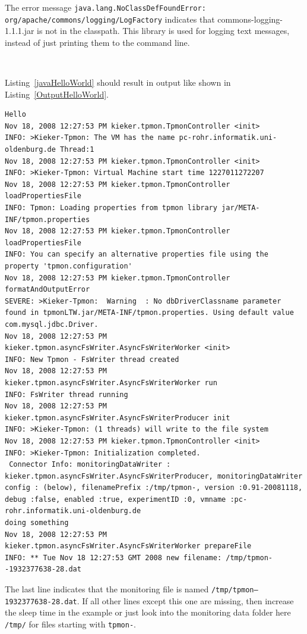 \documentclass[a4paper,12pt]{scrartcl}
\begin{document}
The error message \texttt{\small java.lang.NoClassDefFoundError:\\org/apache/commons/logging/LogFactory} indicates that commons-logging-1.1.1.jar is not in the classpath. This library is used for logging text messages, instead of just printing them to the command line.

\

Listing~\ref{javaHelloWorld} should result in output like shown in Listing~\ref{OutputHelloWorld}.
\begin{lstlisting}[caption={Compilation and execution with AspectJ's Java agent.},label={OutputHelloWorld},language=clean,basicstyle=\ttfamily\footnotesize,keywordstyle=\ttfamily\footnotesize]
Hello
Nov 18, 2008 12:27:53 PM kieker.tpmon.TpmonController <init>
INFO: >Kieker-Tpmon: The VM has the name pc-rohr.informatik.uni-oldenburg.de Thread:1
Nov 18, 2008 12:27:53 PM kieker.tpmon.TpmonController <init>
INFO: >Kieker-Tpmon: Virtual Machine start time 1227011272207
Nov 18, 2008 12:27:53 PM kieker.tpmon.TpmonController loadPropertiesFile
INFO: Tpmon: Loading properties from tpmon library jar/META-INF/tpmon.properties
Nov 18, 2008 12:27:53 PM kieker.tpmon.TpmonController loadPropertiesFile
INFO: You can specify an alternative properties file using the property 'tpmon.configuration'
Nov 18, 2008 12:27:53 PM kieker.tpmon.TpmonController formatAndOutputError
SEVERE: >Kieker-Tpmon:  Warning  : No dbDriverClassname parameter found in tpmonLTW.jar/META-INF/tpmon.properties. Using default value com.mysql.jdbc.Driver.
Nov 18, 2008 12:27:53 PM kieker.tpmon.asyncFsWriter.AsyncFsWriterWorker <init>
INFO: New Tpmon - FsWriter thread created
Nov 18, 2008 12:27:53 PM kieker.tpmon.asyncFsWriter.AsyncFsWriterWorker run
INFO: FsWriter thread running
Nov 18, 2008 12:27:53 PM kieker.tpmon.asyncFsWriter.AsyncFsWriterProducer init
INFO: >Kieker-Tpmon: (1 threads) will write to the file system
Nov 18, 2008 12:27:53 PM kieker.tpmon.TpmonController <init>
INFO: >Kieker-Tpmon: Initialization completed.
 Connector Info: monitoringDataWriter : kieker.tpmon.asyncFsWriter.AsyncFsWriterProducer, monitoringDataWriter config : (below), filenamePrefix :/tmp/tpmon-, version :0.91-20081118, debug :false, enabled :true, experimentID :0, vmname :pc-rohr.informatik.uni-oldenburg.de
doing something
Nov 18, 2008 12:27:53 PM kieker.tpmon.asyncFsWriter.AsyncFsWriterWorker prepareFile
INFO: ** Tue Nov 18 12:27:53 GMT 2008 new filename: /tmp/tpmon--1932377638-28.dat
\end{lstlisting}
The last line indicates that the monitoring file is named \texttt{\small /tmp/tpmon--1932377638-28.dat}. If all other lines except this one are missing, then increase the sleep time in the example or just look into the monitoring data folder here \texttt{/tmp/} for files starting with \texttt{tpmon-}.
\end{document}
